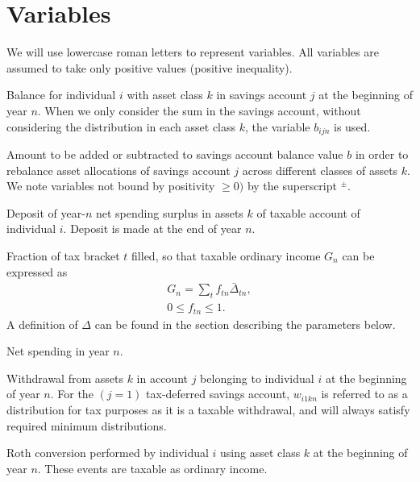 \documentclass{article}[fleqn,12pt]
\begin{document}
\section{Variables}
We will use lowercase roman letters to represent variables. All variables are assumed
to take only positive values (positive inequality).
\begin{description}[leftmargin=4em,style=multiline]
\item [$b_{ijkn}$]
	Balance for individual $i$ with asset class $k$ in savings account $j$ at the beginning of year $n$.
	When we only consider the sum in the savings account, without considering the distribution
	in each asset class $k$, the variable $b_{ijn}$ is used.
\item [$b^\pm_{ijkn}$]
	Amount to be added or subtracted to savings account balance value $b$ in order
	to rebalance asset allocations of
	savings account $j$ across different classes of assets $k$. We note
		variables not bound by positivity $\ge 0)$ by the superscript $^\pm$.
\item [$d_{ikn}$]
	Deposit of year-$n$ net spending surplus in assets $k$ of taxable account of individual $i$.
	Deposit is made at the end of year $n$.
\item [$f_{t n}$]
	Fraction of tax bracket $t$ filled, so that taxable ordinary income $G_n$ can be expressed as
	\begin{eqnarray}
		\label{Eq:Tx1}
		G_n = \sum_t f_{t n}\bar{\Delta}_{t n},\\
		0 \leq f_{t n} \leq 1.
	\end{eqnarray}
	A definition of $\Delta$ can be found in the section describing the parameters below. 
\item [$g_n$]
	Net spending in year $n$.
\item [$w_{ijkn}$]
	Withdrawal from assets $k$ in account $j$ belonging to individual $i$ at the beginning of year $n$.
	For the $(j=1)$ tax-deferred savings account, $w_{i1kn}$ is referred to as a distribution for
	tax purposes as it is a taxable withdrawal, and will always satisfy required minimum distributions.
\item [$x_{ikn}$]
	Roth conversion performed by individual $i$ using asset class $k$ at the beginning of year $n$.
	These events are taxable as ordinary income.
\end{description}
\end{document}
